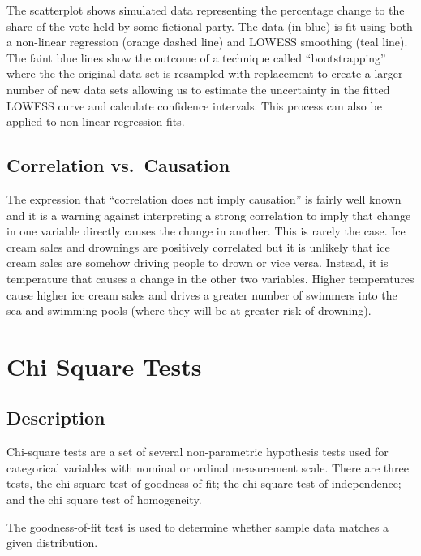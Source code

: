 \documentclass[
]{book}
\begin{document}
The scatterplot shows simulated data representing the percentage change to the share of the vote held by some fictional party. The data (in blue) is fit using both a non-linear regression (orange dashed line) and LOWESS smoothing (teal line). The faint blue lines show the outcome of a technique called ``bootstrapping'' where the the original data set is resampled with replacement to create a larger number of new data sets allowing us to estimate the uncertainty in the fitted LOWESS curve and calculate confidence intervals. This process can also be applied to non-linear regression fits.

\hypertarget{correlation-vs.-causation}{%
\section{Correlation vs.~Causation}\label{correlation-vs.-causation}}

The expression that ``correlation does not imply causation'' is fairly well known and it is a warning against interpreting a strong correlation to imply that change in one variable directly causes the change in another. This is rarely the case. Ice cream sales and drownings are positively correlated but it is unlikely that ice cream sales are somehow driving people to drown or vice versa. Instead, it is temperature that causes a change in the other two variables. Higher temperatures cause higher ice cream sales and drives a greater number of swimmers into the sea and swimming pools (where they will be at greater risk of drowning).

\hypertarget{chisq}{%
\chapter{Chi Square Tests}\label{chisq}}

\hypertarget{description}{%
\section{Description}\label{description}}

Chi-square tests are a set of several non-parametric hypothesis tests used for categorical variables with nominal or ordinal measurement scale. There are three tests, the chi square test of goodness of fit; the chi square test of independence; and the chi square test of homogeneity.

The goodness-of-fit test is used to determine whether sample data matches a given distribution.
\end{document}
